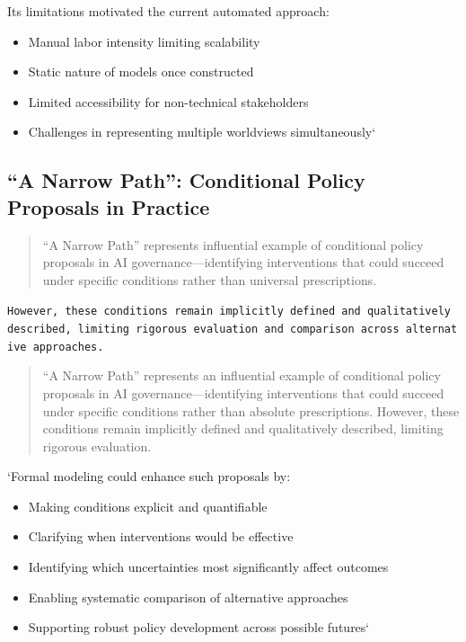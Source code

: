 \documentclass[
  11pt,
  letterpaper,
]{book}
\providecommand{\tightlist}{%
  \setlength{\itemsep}{0pt}\setlength{\parskip}{0pt}}
\begin{document}
Its limitations motivated the current automated approach:

\begin{itemize}
\tightlist
\item
  Manual labor intensity limiting scalability
\item
  Static nature of models once constructed
\item
  Limited accessibility for non-technical stakeholders
\item
  Challenges in representing multiple worldviews simultaneously`
\end{itemize}

\subsection{``A Narrow Path'': Conditional Policy Proposals in
Practice}\label{sec-narrow-path}

\begin{quote}
``A Narrow Path'' represents influential example of conditional policy
proposals in AI governance---identifying interventions that could
succeed under specific conditions rather than universal prescriptions.
\end{quote}

\texttt{However,\ these\ conditions\ remain\ implicitly\ defined\ and\ qualitatively\ described,\ limiting\ rigorous\ evaluation\ and\ comparison\ across\ alternative\ approaches.}

\begin{quote}
``A Narrow Path'' represents an influential example of conditional
policy proposals in AI governance---identifying interventions that could
succeed under specific conditions rather than absolute prescriptions.
However, these conditions remain implicitly defined and qualitatively
described, limiting rigorous evaluation.
\end{quote}

`Formal modeling could enhance such proposals by:

\begin{itemize}
\tightlist
\item
  Making conditions explicit and quantifiable
\item
  Clarifying when interventions would be effective
\item
  Identifying which uncertainties most significantly affect outcomes
\item
  Enabling systematic comparison of alternative approaches
\item
  Supporting robust policy development across possible futures`
\end{itemize}
\end{document}
